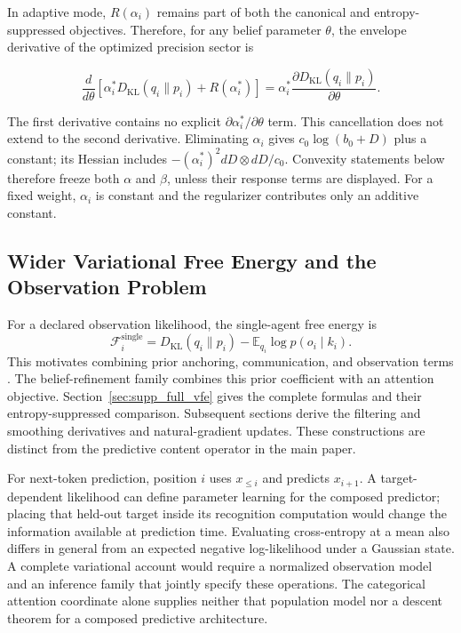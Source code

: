 \documentclass[twoside,11pt]{article}
\begin{document}
In adaptive mode, $R(\alpha_i)$ remains part of both the canonical and entropy-suppressed objectives. Therefore, for any belief parameter $\theta$, the envelope derivative of the optimized precision sector is

\begin{equation}
\frac{d}{d\theta}
\left[\alpha_i^*D_{\mathrm{KL}}(q_i\|p_i)+R(\alpha_i^*)\right]
=\alpha_i^*\frac{\partial D_{\mathrm{KL}}(q_i\|p_i)}{\partial\theta}.
\label{eq:alpha_envelope_gradient}
\end{equation}

The first derivative contains no explicit $\partial\alpha_i^*/\partial\theta$ term. This cancellation does not extend to the second derivative. Eliminating $\alpha_i$ gives $c_0\log(b_0+D)$ plus a constant; its Hessian includes $-(\alpha_i^*)^2dD\otimes dD/c_0$. Convexity statements below therefore freeze both $\alpha$ and $\beta$, unless their response terms are displayed. For a fixed weight, $\alpha_i$ is constant and the regularizer contributes only an additive constant.


\subsection{Wider Variational Free Energy and the Observation Problem}
\label{sec:final_free_energy}
For a declared observation likelihood, the single-agent free energy is
\begin{equation}
\mathcal F_i^{\mathrm{single}}
=D_{\mathrm{KL}}(q_i\|p_i)-\mathbb E_{q_i}\log p(o_i\mid k_i).
\label{eq:single_agent_fep}
\end{equation}
This motivates combining prior anchoring, communication, and observation terms \citep{Friston2010,Blei2017}.
The belief-refinement family combines this prior coefficient with an attention objective. Section~\ref{sec:supp_full_vfe} gives the complete formulas and their entropy-suppressed comparison. Subsequent sections derive the filtering and smoothing derivatives and natural-gradient updates. These constructions are distinct from the predictive content operator in the main paper.

For next-token prediction, position $i$ uses $x_{\le i}$ and predicts $x_{i+1}$. A target-dependent likelihood can define parameter learning for the composed predictor; placing that held-out target inside its recognition computation would change the information available at prediction time. Evaluating cross-entropy at a mean also differs in general from an expected negative log-likelihood under a Gaussian state. A complete variational account would require a normalized observation model and an inference family that jointly specify these operations. The categorical attention coordinate alone supplies neither that population model nor a descent theorem for a composed predictive architecture.
\end{document}
